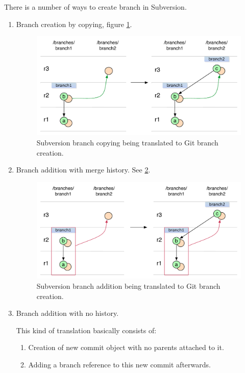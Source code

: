 There is a number of ways to create branch in Subversion.

\begin{enumerate}
\compactlist
\item Branch creation by copying, figure \ref{branch_creation_svn_to_git}.

\begin{figure}[!h]
\centering
\includegraphics[width=\linewidth]{img/diagrams/branch_creation_svn_to_git.pdf}
\caption{Subversion branch copying being translated to Git branch creation.}
\label{branch_creation_svn_to_git}
\end{figure}

\item Branch addition with merge history. See \ref{branch_creation_from_mergeinfo_svn_to_git}.

\begin{figure}[!h]
\centering
\includegraphics[width=\linewidth]{img/diagrams/branch_creation_from_mergeinfo_svn_to_git.pdf}
\caption{Subversion branch addition being translated to Git branch creation.}
\label{branch_creation_from_mergeinfo_svn_to_git}
\end{figure}

\item Branch addition with no history.

This kind of translation basically consists of:
\begin{enumerate}
	\item Creation of new commit object with no parents attached to it.
	\item Adding a branch reference to this new commit afterwards.
\end{enumerate}

\end{enumerate}

